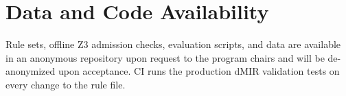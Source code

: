 \label{sec:availability}
\section*{Data and Code Availability}

Rule sets, offline Z3 admission checks, evaluation scripts, and data
are available in an anonymous repository upon request to the program
chairs and will be de-anonymized upon acceptance. CI runs the production
dMIR validation tests on every change to the rule file.
\vspace{-1.2\baselineskip}
